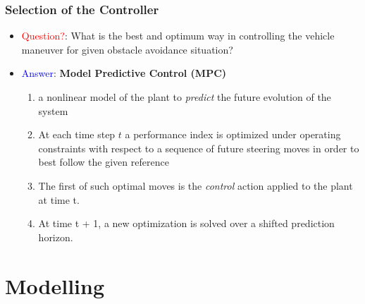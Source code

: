 \documentclass{beamer}
\begin{document}
\begin{frame}
	
	\frametitle{Selection of the Controller}
	\begin{itemize}
		\item \textcolor{red}{Question?}: What is
the best and optimum way in controlling the vehicle maneuver for given obstacle
avoidance situation?
		\vspace{5mm}
		\item \textcolor{blue}{Answer}: \textbf{Model Predictive Control (MPC)}
		\begin{enumerate}[$\bullet$]
			\item a
nonlinear model of the plant to \textit{predict} the future evolution of the system
			\vspace{2mm}
			\item At each time step $t$ a performance index is
optimized under operating constraints with respect to a sequence of future steering
moves in order to best follow the given reference
			\vspace{2mm}
			\item The first of
such optimal moves is the \textit{control} action applied to the plant at time t.
			\vspace{2mm}
			\item At time
t + 1, a new optimization is solved over a shifted prediction horizon.
		\end{enumerate}
	\end{itemize}
	
\end{frame}

\section{Modelling}
\end{document}
